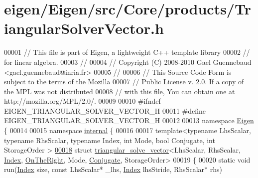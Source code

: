 \hypertarget{eigen_2_eigen_2src_2_core_2products_2_triangular_solver_vector_8h_source}{}\section{eigen/\+Eigen/src/\+Core/products/\+Triangular\+Solver\+Vector.h}
\label{eigen_2_eigen_2src_2_core_2products_2_triangular_solver_vector_8h_source}

\begin{DoxyCode}
00001 \textcolor{comment}{// This file is part of Eigen, a lightweight C++ template library}
00002 \textcolor{comment}{// for linear algebra.}
00003 \textcolor{comment}{//}
00004 \textcolor{comment}{// Copyright (C) 2008-2010 Gael Guennebaud <gael.guennebaud@inria.fr>}
00005 \textcolor{comment}{//}
00006 \textcolor{comment}{// This Source Code Form is subject to the terms of the Mozilla}
00007 \textcolor{comment}{// Public License v. 2.0. If a copy of the MPL was not distributed}
00008 \textcolor{comment}{// with this file, You can obtain one at http://mozilla.org/MPL/2.0/.}
00009 
00010 \textcolor{preprocessor}{#ifndef EIGEN\_TRIANGULAR\_SOLVER\_VECTOR\_H}
00011 \textcolor{preprocessor}{#define EIGEN\_TRIANGULAR\_SOLVER\_VECTOR\_H}
00012 
00013 \textcolor{keyword}{namespace }\hyperlink{namespace_eigen}{Eigen} \{
00014 
00015 \textcolor{keyword}{namespace }\hyperlink{namespaceinternal}{internal} \{
00016 
00017 \textcolor{keyword}{template}<\textcolor{keyword}{typename} LhsScalar, \textcolor{keyword}{typename} RhsScalar, \textcolor{keyword}{typename} Index, \textcolor{keywordtype}{int} Mode, \textcolor{keywordtype}{bool} Conjugate, \textcolor{keywordtype}{int} StorageOrder
      >
\hyperlink{struct_eigen_1_1internal_1_1triangular__solve__vector_3_01_lhs_scalar_00_01_rhs_scalar_00_01_ind2257c92bae887c34b8b6b704148c0908}{00018} \textcolor{keyword}{struct }\hyperlink{struct_eigen_1_1internal_1_1triangular__solve__vector}{triangular\_solve\_vector}<LhsScalar, RhsScalar, 
      \hyperlink{namespace_eigen_a62e77e0933482dafde8fe197d9a2cfde}{Index}, \hyperlink{group__enums_ggac22de43beeac7a78b384f99bed5cee0ba99dc75d8e00b6c3a5bdc31940f47492b}{OnTheRight}, Mode, \hyperlink{class_eigen_1_1_conjugate}{Conjugate}, StorageOrder>
00019 \{
00020   \textcolor{keyword}{static} \textcolor{keywordtype}{void} run(\hyperlink{namespace_eigen_a62e77e0933482dafde8fe197d9a2cfde}{Index} size, \textcolor{keyword}{const} LhsScalar* \_lhs, \hyperlink{namespace_eigen_a62e77e0933482dafde8fe197d9a2cfde}{Index} lhsStride, RhsScalar* rhs)

\end{DoxyCode}
